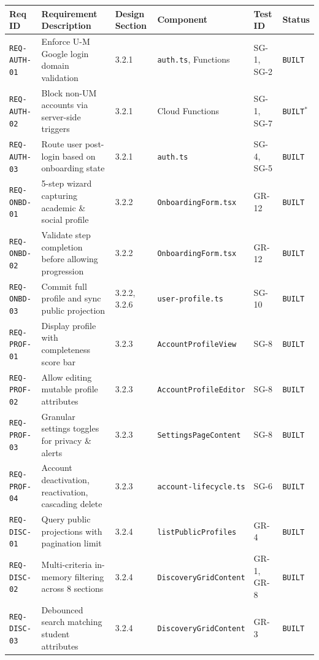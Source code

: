 \documentclass[11pt,letterpaper]{article}
\begin{document}
\begin{table}[h!]
\centering
\scriptsize
\begin{tabularx}{\textwidth}{p{2.1cm} Y p{1.5cm} p{2.5cm} p{1.4cm} p{1.4cm}}
\toprule
\textbf{Req ID} & \textbf{Requirement Description} & \textbf{Design Section} & \textbf{Component} & \textbf{Test ID} & \textbf{Status} \\
\midrule
\texttt{REQ-AUTH-01} & Enforce U-M Google login domain validation & 3.2.1 & \texttt{auth.ts}, Functions & SG-1, SG-2 & \texttt{BUILT} \\
\texttt{REQ-AUTH-02} & Block non-UM accounts via server-side triggers & 3.2.1 & Cloud Functions & SG-1, SG-7 & \texttt{BUILT}$^*$ \\
\texttt{REQ-AUTH-03} & Route user post-login based on onboarding state & 3.2.1 & \texttt{auth.ts} & SG-4, SG-5 & \texttt{BUILT} \\
\texttt{REQ-ONBD-01} & 5-step wizard capturing academic \& social profile & 3.2.2 & \texttt{OnboardingForm.tsx} & GR-12 & \texttt{BUILT} \\
\texttt{REQ-ONBD-02} & Validate step completion before allowing progression & 3.2.2 & \texttt{OnboardingForm.tsx} & GR-12 & \texttt{BUILT} \\
\texttt{REQ-ONBD-03} & Commit full profile and sync public projection & 3.2.2, 3.2.6 & \texttt{user-profile.ts} & SG-10 & \texttt{BUILT} \\
\texttt{REQ-PROF-01} & Display profile with completeness score bar & 3.2.3 & \texttt{AccountProfileView} & SG-8 & \texttt{BUILT} \\
\texttt{REQ-PROF-02} & Allow editing mutable profile attributes & 3.2.3 & \texttt{AccountProfileEditor} & SG-8 & \texttt{BUILT} \\
\texttt{REQ-PROF-03} & Granular settings toggles for privacy \& alerts & 3.2.3 & \texttt{SettingsPageContent} & SG-8 & \texttt{BUILT} \\
\texttt{REQ-PROF-04} & Account deactivation, reactivation, cascading delete & 3.2.3 & \texttt{account-lifecycle.ts} & SG-6 & \texttt{BUILT} \\
\texttt{REQ-DISC-01} & Query public projections with pagination limit & 3.2.4 & \texttt{listPublicProfiles} & GR-4 & \texttt{BUILT} \\
\texttt{REQ-DISC-02} & Multi-criteria in-memory filtering across 8 sections & 3.2.4 & \texttt{DiscoveryGridContent} & GR-1, GR-8 & \texttt{BUILT} \\
\texttt{REQ-DISC-03} & Debounced search matching student attributes & 3.2.4 & \texttt{DiscoveryGridContent} & GR-3 & \texttt{BUILT} \\

\end{tabularx}
\end{table}
\end{document}
